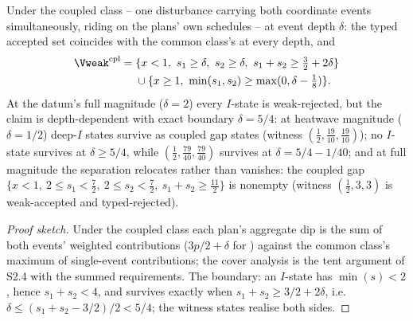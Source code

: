 \begin{theorem}\label{thm:coupled}
Under the coupled class -- one disturbance carrying both coordinate events simultaneously, riding on the plans' own schedules -- at event depth $\delta$: the typed accepted set coincides with the common class's at every depth, and
\begin{align*}
\Vweak^{\mathrm{cpl}}={}&\{x<1,\ s_1\ge\delta,\ s_2\ge\delta,\ s_1+s_2\ge\tfrac32+2\delta\}\\
&\cup\{x\ge1,\ \min(s_1,s_2)\ge\max(0,\delta-\tfrac18)\}.
\end{align*}
At the datum's full magnitude ($\delta=2$) every $I$-state is weak-rejected, but the claim is depth-dependent with exact boundary $\delta=5/4$: at heatwave magnitude ($\delta=1/2$) deep-$I$ states survive as coupled gap states (witness $(\tfrac12,\tfrac{19}{10},\tfrac{19}{10})$); no $I$-state survives at $\delta\ge5/4$, while $(\tfrac12,\tfrac{79}{40},\tfrac{79}{40})$ survives at $\delta=5/4-1/40$; and at full magnitude the separation relocates rather than vanishes: the coupled gap $\{x<1,\ 2\le s_1<\tfrac72,\ 2\le s_2<\tfrac72,\ s_1+s_2\ge\tfrac{11}2\}$ is nonempty (witness $(\tfrac12,3,3)$ is weak-accepted and typed-rejected).
\end{theorem}
\begin{proof}[Proof sketch]
Under the coupled class each plan's aggregate dip is the sum of both events' weighted contributions ($3p/2+\delta$ for ) against the common class's maximum of single-event contributions; the cover analysis is the tent argument of S2.4 with the summed requirements. The boundary: an $I$-state has $\min(s)<2$, hence $s_1+s_2<4$, and survives exactly when $s_1+s_2\ge3/2+2\delta$, i.e.\ $\delta\le(s_1+s_2-3/2)/2<5/4$; the witness states realise both sides.
\end{proof}

